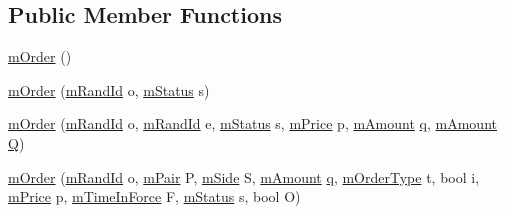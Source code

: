 \subsection*{Public Member Functions}
\begin{DoxyCompactItemize}
\item 
\hyperlink{struct_k_1_1m_order_a6b30d89f1fbef9b56d8e678c49ab225f}{m\+Order} ()
\item 
\hyperlink{struct_k_1_1m_order_a5b7277822fa6487df0498ebc5fecc715}{m\+Order} (\hyperlink{km_8h_a23233b27e494114073abc4d494b05626}{m\+Rand\+Id} o, \hyperlink{namespace_k_a9ca92b450f3b1738c485770d136ac9e0}{m\+Status} s)
\item 
\hyperlink{struct_k_1_1m_order_abc5cbba58af76ee5f1ef93f7eef5a3f0}{m\+Order} (\hyperlink{km_8h_a23233b27e494114073abc4d494b05626}{m\+Rand\+Id} o, \hyperlink{km_8h_a23233b27e494114073abc4d494b05626}{m\+Rand\+Id} e, \hyperlink{namespace_k_a9ca92b450f3b1738c485770d136ac9e0}{m\+Status} s, \hyperlink{km_8h_a392f9b7f384aa3539bbb890b059f5b8c}{m\+Price} p, \hyperlink{km_8h_ad4d00888c55a47a8a40ed8020d176086}{m\+Amount} \hyperlink{namespace_k_a211862d8b09ec46a051464b6859c1306a7694f4a66316e53c8cdd9d9954bd611d}{q}, \hyperlink{km_8h_ad4d00888c55a47a8a40ed8020d176086}{m\+Amount} \hyperlink{namespace_k_a211862d8b09ec46a051464b6859c1306af09564c9ca56850d4cd6b3319e541aee}{Q})
\item 
\hyperlink{struct_k_1_1m_order_a291bbc8e7cb35b53e1ef3885de56c08e}{m\+Order} (\hyperlink{km_8h_a23233b27e494114073abc4d494b05626}{m\+Rand\+Id} o, \hyperlink{struct_k_1_1m_pair}{m\+Pair} P, \hyperlink{namespace_k_a0b7d0fa0ffc9f87da1d6499cbcee7e94}{m\+Side} S, \hyperlink{km_8h_ad4d00888c55a47a8a40ed8020d176086}{m\+Amount} \hyperlink{namespace_k_a211862d8b09ec46a051464b6859c1306a7694f4a66316e53c8cdd9d9954bd611d}{q}, \hyperlink{namespace_k_a131435180aff10fab1bf3da09af62b0d}{m\+Order\+Type} t, bool i, \hyperlink{km_8h_a392f9b7f384aa3539bbb890b059f5b8c}{m\+Price} p, \hyperlink{namespace_k_a290fccb3fc7d447fdbb93a61f6dfba44}{m\+Time\+In\+Force} F, \hyperlink{namespace_k_a9ca92b450f3b1738c485770d136ac9e0}{m\+Status} s, bool O)
\end{DoxyCompactItemize}
